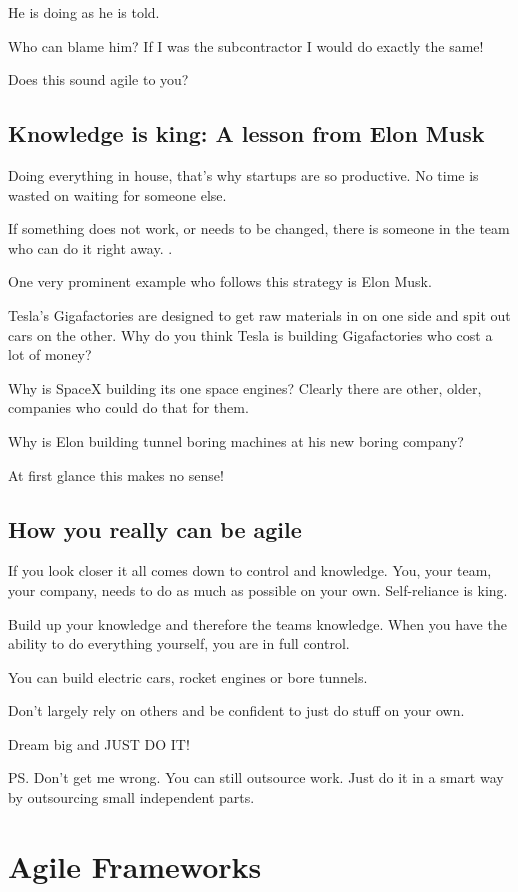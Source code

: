 \documentclass[12pt, numbers=noenddot]{scrreprt} %
\begin{document}
He is doing as he is told.

Who can blame him? If I was the subcontractor I would do exactly the same!

Does this sound agile to you?

\subsection{Knowledge is king: A lesson from Elon Musk}
Doing everything in house, that’s why startups are so productive. No time is wasted on waiting for someone else.

If something does not work, or needs to be changed, there is someone in the team who can do it right away.                        .

One very prominent example who follows this strategy is Elon Musk.

Tesla’s Gigafactories are designed to get raw materials in on one side and spit out cars on the other. Why do you think Tesla is building Gigafactories who cost a lot of money?

Why is SpaceX building its one space engines? Clearly there are other, older, companies who could do that for them.

Why is Elon building tunnel boring machines at his new boring company?

At first glance this makes no sense!

\subsection{How you really can be agile}
If you look closer it all comes down to control and knowledge. You, your team, your company, needs to do as much as possible on your own. Self-reliance is king.

Build up your knowledge and therefore the teams knowledge. When you have the ability to do everything yourself, you are in full control.

You can build electric cars, rocket engines or bore tunnels.

Don’t largely rely on others and be confident to just do stuff on your own.

Dream big and JUST DO IT!

PS. Don’t get me wrong. You can still outsource work. Just do it in a smart way by outsourcing small independent parts.

\section{Agile Frameworks}
\end{document}
